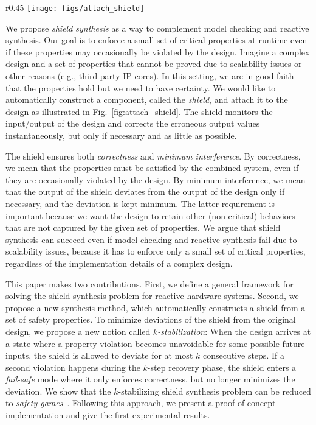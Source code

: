 \documentclass{llncs}
\begin{document}
\begin{wrapfigure}[7]{r}{0.45\textwidth}
\vspace{-0.6cm}
\texttt{[image: figs/attach\_shield]}
\caption{Attaching a safety shield.\\}
\label{fig:attach_shield}
\end{wrapfigure}

We propose \emph{shield synthesis} as a way to complement model checking 
and reactive synthesis.  Our goal is to enforce a small set of critical 
properties at runtime even if these properties may occasionally be 
violated by the design.  Imagine a complex design and a set of 
properties that cannot be proved due to scalability issues or other 
reasons (e.g., third-party IP cores). In this setting, we are in good 
faith that the properties hold but we need to have certainty.  We would 
like to automatically construct a component, called the \emph{shield}, 
and attach it to the design as illustrated in 
Fig.~\ref{fig:attach_shield}. The shield monitors the input/output of 
the design and corrects the erroneous output values instantaneously, but 
only if necessary and as little as possible.

The shield ensures both \emph{correctness} and \emph{minimum 
interference}.  By correctness, we mean that the properties must be 
satisfied by the combined system, even if they are occasionally violated 
by the design.  By minimum interference, we mean that the output of the 
shield deviates from the output of the design only if necessary, and the 
deviation is kept minimum.  The latter requirement is important because 
we want the design to retain other (non-critical) behaviors that are not 
captured by the given set of properties.  We argue that shield synthesis 
can succeed even if model checking and reactive synthesis fail due to 
scalability issues, because it has to enforce only a small set of 
critical properties, regardless of the implementation details of a 
complex design. 

This paper makes two contributions. First, we define a general framework 
for solving the shield synthesis problem for reactive hardware systems. 
Second, we propose a new synthesis method, which automatically 
constructs a shield from a set of safety properties. To minimize 
deviations of the shield from the original design, we propose a new 
notion called \emph{$k$-stabilization}:  When the design arrives at a 
state where a property violation becomes unavoidable for some possible 
future inputs, the shield is allowed to deviate for at most $k$ 
consecutive steps.  If a second violation happens during the $k$-step 
recovery phase, the shield enters a \emph{fail-safe} mode where it only 
enforces correctness, but no longer minimizes the deviation. We show 
that the $k$-stabilizing shield synthesis problem can be reduced to 
\emph{safety games}~\cite{Mazala01}. Following this approach, we present a 
proof-of-concept implementation and give the first experimental 
results.
\end{document}

